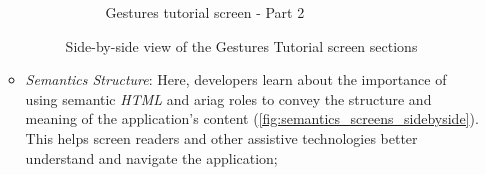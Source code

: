\begin{enumerate}
\begin{itemize}
\begin{figure}[ht]
\begin{subfigure}[b]{0.48\textwidth}
                \caption{Gestures tutorial screen - Part 2}
                \label{fig:gestures-right}
            \end{subfigure}
            \caption{Side-by-side view of the Gestures Tutorial screen sections}
            \label{fig:gestures_screens_sidebyside}
        \end{figure}

        \FloatBarrier

        \item \textit{Semantics Structure}: Here, developers learn about the importance of using semantic \textit{HTML} and \gls{ariag} roles to convey the structure and meaning of the application's content (\ref{fig:semantics_screens_sidebyside}). This helps screen readers and other assistive technologies better understand and navigate the application;


\end{itemize}
\end{enumerate}

